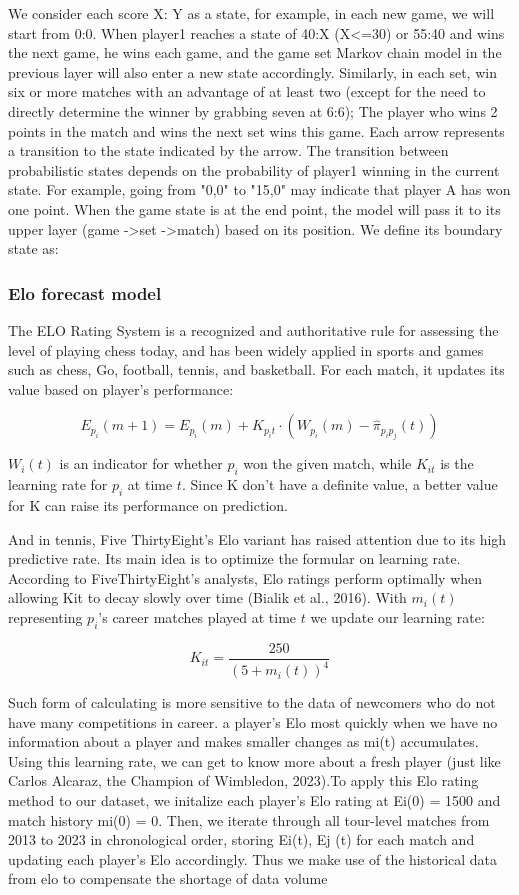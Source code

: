 \documentclass{mcmthesis}
\begin{document}
We consider each score X: Y as a state, for example, in each new game, we will start %
from 0:0. When player1 reaches a state of 40:X (X<=30) or 55:40 and wins the next game, he wins each game, and the game set Markov chain model in the previous layer will also enter a new state accordingly. Similarly, in each set, win six or more matches with an advantage of at least two (except for the need to directly determine the winner by grabbing seven at 6:6); The player who wins 2 points in the match and wins the next set wins this game.
Each arrow represents a transition to the state indicated by the arrow. The transition %
between probabilistic states depends on the probability of player1 winning in the current %
state. For example, going from "0,0" to "15,0" may indicate that player A has won one point. %
When the game state is at the end point, the model will pass it to its upper layer %
(game ->set ->match) based on its position. We define its boundary state as:

\subsubsection{Elo forecast model}
The ELO Rating System is a recognized and authoritative rule for assessing the level of %
playing chess today, and has been widely applied in sports and games such as chess, Go, %
football, tennis, and basketball. For each match, it updates its value based on player's performance:

\[
E_{p_i}(m + 1) = E_{p_i}(m) + K_{p_it} \cdot (W_{p_i}(m) - \hat{\pi}_{{p_i}{p_j}}(t))
\]

\(W_i(t)\) is an indicator for whether \(p_i\) won the given match, while \(K_{it}\) is the learning rate %
for \(p_i\) at time \(t\). Since K don't have a definite value, a better value for K can raise its performance%
on prediction.

And in tennis, Five ThirtyEight's Elo variant has raised attention due to its high predictive rate. %
Its main idea is to optimize the formular on learning rate. According to FiveThirtyEight’s analysts, %
Elo ratings perform optimally when allowing Kit to decay slowly over time (Bialik et al., 2016).%
With \(m_i(t)\) representing \(p_i\)'s career matches played at time \(t\) we update our learning rate:

\[
K_{it} = \frac{250}{(5 + m_i(t))^4}
\]


Such form of calculating is more sensitive to the data of newcomers who do not have many competitions in career. %
a player’s Elo most quickly when we have no information about a player
and makes smaller changes as mi(t) accumulates. Using this learning rate, we can get to know more about %
a fresh player (just like Carlos Alcaraz, the Champion of Wimbledon, 2023).To apply this Elo rating method to our
dataset, we initalize each player’s Elo rating at Ei(0) = 1500 and match history mi(0) = 0.
Then, we iterate through all tour-level matches from 2013 to 2023 in chronological order, storing
Ei(t), Ej (t) for each match and updating each player’s Elo accordingly. Thus we make use of the %
historical data from elo to compensate the shortage of data volume
\end{document}
